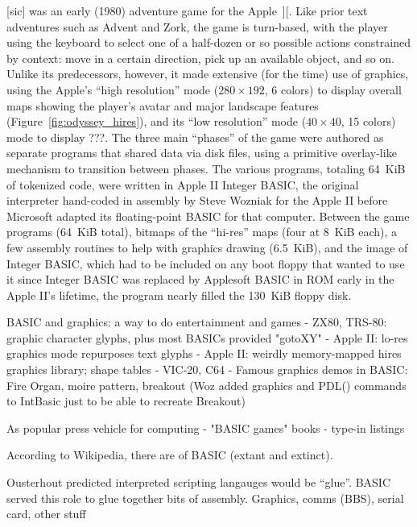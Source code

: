  [sic] was an early (1980) adventure game
for the Apple~][.
Like prior text adventures such as Advent and Zork, the game is
turn-based, with the player using the 
keyboard to select one of a half-dozen or so possible actions
constrained by context: move in a certain direction, pick up an
available object, and so on.
Unlike its predecessors, however, it made extensive (for the time) use of
graphics, using the Apple's ``high resolution'' mode ($280\times 192$, 6 colors)
to display overall maps showing the player's
avatar and major landscape features (Figure~\ref{fig:odyssey_hires}), and its
``low resolution'' mode ($40\times 40$, 15
colors) mode to display ???.
The three main ``phases'' of the game were authored as separate programs
that shared data via disk files, using a primitive overlay-like mechanism
to transition between phases.  
The various programs, totaling 64~KiB of tokenized code, were written in Apple II Integer
BASIC, the 
original interpreter hand-coded in assembly by Steve Wozniak for
the Apple II before Microsoft adapted its floating-point BASIC for that
computer.  Between the game programs (64~KiB total), bitmaps of the ``hi-res''
maps (four at 8~KiB each), a few assembly routines to help with graphics
drawing (6.5~KiB), and the image of Integer BASIC, which had to be
included on any boot floppy that wanted to use it since Integer BASIC
was replaced by Applesoft BASIC in ROM early in the Apple II's lifetime,
the program nearly filled the 130~KiB floppy disk.



BASIC and graphics: a way to do entertainment and games
  - ZX80, TRS-80: graphic character glyphs, plus most BASICs provided "gotoXY"
  - Apple II: lo-res graphics mode repurposes text glyphs
  - Apple II: weirdly memory-mapped hires graphics library; shape tables
  - VIC-20, C64
  - Famous graphics demos in BASIC: Fire Organ, moire pattern, breakout
  (Woz added graphics and PDL() commands to IntBasic just to be able to
  recreate Breakout)

As popular press vehicle for computing
  - "BASIC games" books
  - type-in listings


According to Wikipedia,
there are  of BASIC
(extant and extinct).



Ousterhout predicted interpreted scripting langauges would be ``glue''.
BASIC served this role to glue together bits of assembly.  Graphics,
comms (BBS), serial card, other stuff


